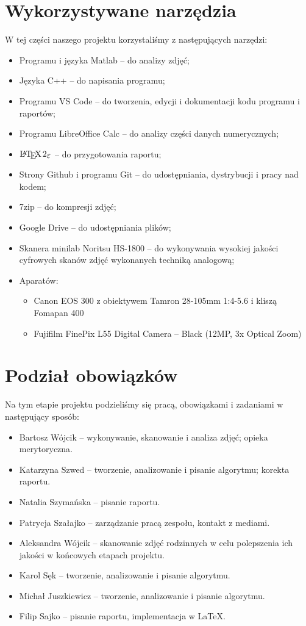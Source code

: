 \documentclass[]{mwart}
\begin{document}
\newpage
\section{Wykorzystywane narzędzia}
W tej części naszego projektu korzystaliśmy z następujących narzędzi:
\begin{itemize}
    \item Programu i języka Matlab -- do analizy zdjęć;
    \item Języka C++ -- do napisania programu;
    \item Programu VS Code -- do tworzenia, edycji i dokumentacji kodu programu i raportów;
    \item Programu LibreOffice Calc -- do analizy części danych numerycznych;
    \item $\LaTeXe{}$ -- do przygotowania raportu;
    \item Strony Github i programu Git -- do udostępniania, dystrybucji i pracy nad kodem;
    \item 7zip -- do kompresji zdjęć;
    \item Google Drive -- do udostępniania plików;
    \item Skanera minilab Noritsu HS-1800 -- do wykonywania wysokiej jakości cyfrowych skanów zdjęć wykonanych techniką analogową;
    \item Aparatów:
          \begin{itemize}
              \item Canon EOS 300 z obiektywem Tamron 28-105mm 1:4-5.6 i kliszą Fomapan 400
              \item Fujifilm FinePix L55 Digital Camera -- Black (12MP, 3x Optical Zoom)
          \end{itemize}
\end{itemize}


\section{Podział obowiązków}
Na tym etapie projektu podzieliśmy się pracą, obowiązkami i zadaniami w następujący sposób:
\begin{itemize}
    \item Bartosz Wójcik -- wykonywanie, skanowanie i analiza zdjęć; opieka merytoryczna.
    \item Katarzyna Szwed -- tworzenie, analizowanie i pisanie algorytmu; korekta raportu.
    \item Natalia Szymańska -- pisanie raportu.
    \item Patrycja Szałajko -- zarządzanie pracą zespołu, kontakt z mediami.
    \item Aleksandra Wójcik -- skanowanie zdjęć rodzinnych w celu polepszenia ich jakości w końcowych etapach projektu.
    \item Karol Sęk -- tworzenie, analizowanie i pisanie algorytmu.
    \item Michał Juszkiewicz -- tworzenie, analizowanie i pisanie algorytmu.
    \item Filip Sajko -- pisanie raportu, implementacja w \LaTeX{}.
\end{itemize}
\end{document}
